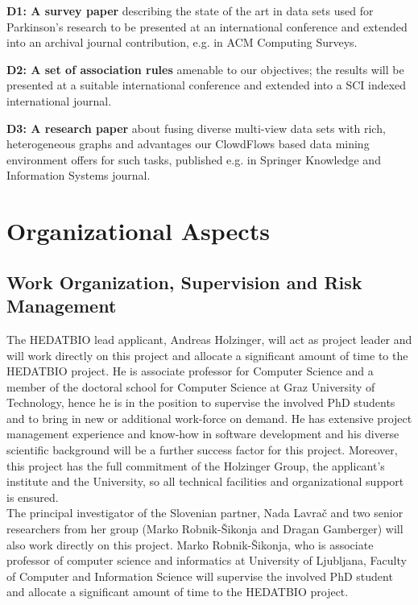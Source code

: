 \documentclass[a4paper,11pt]{article}
\begin{document}
\textbf{D1: A survey paper} describing the state of the art in data sets used for Parkinson's research to be presented at an international conference and extended into an archival journal contribution, e.g. in ACM Computing Surveys. 

\textbf{D2: A set of association rules} amenable to our objectives; the results will be presented at a suitable international conference and extended into a SCI indexed international journal.

\textbf{D3: A research paper} about fusing diverse multi-view data sets with rich, heterogeneous graphs and advantages our ClowdFlows based data mining environment offers for such tasks, published e.g. in Springer Knowledge and Information Systems journal.

\section{Organizational Aspects}

\subsection{Work Organization, Supervision and Risk Management}

The HEDATBIO lead applicant, Andreas Holzinger, will act as project leader and will work directly on this project and allocate a significant amount of time to the HEDATBIO project. He is associate professor for Computer Science and a member of the doctoral school for Computer Science at Graz University of Technology, hence he is in the position to supervise the involved PhD students and to bring in new or additional work-force on demand.
He has extensive project management experience and know-how in software development and his diverse scientific background will be a further success factor for this project. Moreover, this project has the full commitment of the Holzinger Group, the applicant's institute and the University, so all technical facilities and organizational support is ensured.
\\[0,2cm]
The principal investigator of the Slovenian partner, Nada Lavra\v{c} and two senior researchers from her group (Marko Robnik-\v{S}ikonja and Dragan Gamberger) will also work directly on this project. Marko Robnik-\v{S}ikonja, who is associate professor of computer science and informatics at University of Ljubljana, Faculty of Computer and Information Science will supervise the involved PhD student and allocate a significant amount of time to the HEDATBIO project.
\end{document}
